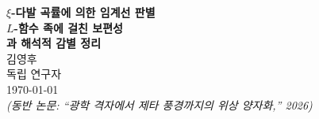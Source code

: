 \documentclass[11pt, a4paper]{article}
\theoremstyle{plain}
\theoremstyle{definition}
\begin{document}
\begin{center}
  {\LARGE\bfseries $\xi$-다발 곡률에 의한 임계선 판별}\\[6pt]
  {\large\bfseries $L$-함수 족에 걸친 보편성\\[2pt]
   과 해석적 감별 정리}\\[18pt]
  {\large 김영후}\\[4pt]
  {\normalsize 독립 연구자}\\[4pt]
  {\small\today}\\[4pt]
  {\small\textit{(동반 논문: ``광학 격자에서 제타 풍경까지의 위상 양자화,'' 2026)}}
\end{center}

\vspace{1.5em}
\end{document}
